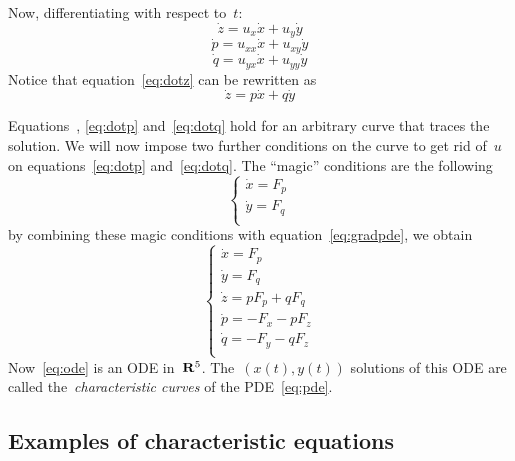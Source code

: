 Now, differentiating with respect to~$t$:
\begin{equation}\label{eq:dotz}
	\dot z=u_x\dot x + u_y\dot y
\end{equation}
\begin{equation}\label{eq:dotp}
	\dot p=u_{xx}\dot x + u_{xy}\dot y
\end{equation}
\begin{equation}\label{eq:dotq}
	\dot q=u_{yx}\dot x + u_{yy}\dot y
\end{equation}
Notice that equation~\ref{eq:dotz} can be rewritten as
\begin{equation}\label{eq:dotz2}\dot z=p\dot x+q\dot y\end{equation}

Equations~\label{eq:dotz2}, \ref{eq:dotp} and~\ref{eq:dotq} hold for an
arbitrary curve that traces the solution.  We will now impose two further
conditions on the curve to get rid of~$u$ on equations~\ref{eq:dotp}
and~\ref{eq:dotq}.  The ``magic'' conditions are the following
\begin{equation}
	\begin{cases}
		\dot x = F_p \\
		\dot y = F_q \\
	\end{cases}
\end{equation}
by combining these magic conditions with equation~\ref{eq:gradpde}, we obtain
\begin{equation}\label{eq:ode}
	\begin{cases}
		\dot x = F_p \\
		\dot y = F_q \\
		\dot z = pF_p + qF_q \\
		\dot p = -F_x - pF_z \\
		\dot q = -F_y - qF_z \\
	\end{cases}
\end{equation}
Now~\ref{eq:ode} is an ODE in~$\mathbf{R}^5$.  The~$\left(x(t),y(t)\right)$ solutions
of this ODE are called the~\emph{characteristic curves} of the
PDE~\ref{eq:pde}.

\subsection{Examples of characteristic equations}

